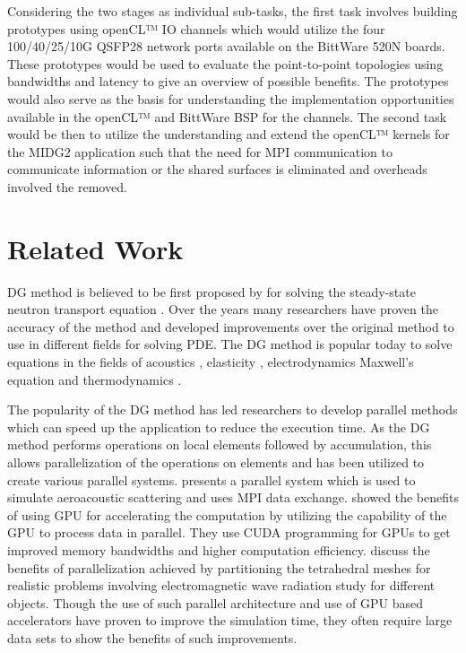 Considering the two stages as individual sub-tasks, the first task involves building
prototypes using openCL™ IO channels which would utilize the four 100/40/25/10G QSFP28
network ports available on the BittWare 520N boards. These prototypes would be used
to evaluate the point-to-point topologies using bandwidths and latency to give an
overview of possible benefits. The prototypes would also serve as the basis for
understanding the implementation opportunities available in the openCL™ and
BittWare BSP for the channels. The second task would be then to utilize the
understanding and extend the openCL™ kernels for the MIDG2 application
such that the need for MPI communication to communicate information or the shared
surfaces is eliminated and overheads involved the removed.


\section{Related Work}

\ac{DG} method is believed to be first proposed by \textcite{reed_triangular_1973} for
solving the steady-state neutron transport equation \cite{hesthaven_nodal_2008}. Over the
years many researchers have proven the accuracy of the method and developed improvements
over the original method to use in different fields for solving \ac{PDE}. The \ac{DG} method
is popular today to solve equations in the fields of acoustics \cite{wilcox_high-order_2010,
atkins_quadrature-free_1998, toulopoulos_high-order_2006}, elasticity \cite{dumbser_arbitrary_2006,
kaser_arbitrary_2006, kaser_arbitrary_2007}, electrodynamics Maxwell’s equation \cite{busch_discontinuous_2011,
cohen_discontinuous_2006, busch_discontinuous_2011, cohen_spatial_2006, cockburn_locally_2004,
konig_discontinuous_2010} and thermodynamics \cite{collis_discontinuous_2002}.

The popularity of the \ac{DG} method has led researchers to develop parallel methods
which can speed up the application to reduce the execution time. As the DG method
performs operations on local elements followed by accumulation, this allows parallelization
of the operations on elements and has been utilized to create various parallel systems.
\textcite{baggag_parallel_1999} presents a parallel system which is used to simulate aeroacoustic
scattering and uses MPI data exchange. \textcite{klockner_nodal_2009} showed the benefits
of using GPU for accelerating the computation by utilizing the capability of the GPU to
process data in parallel. They use CUDA programming for GPUs to get improved memory bandwidths
and higher computation efficiency. \textcite{bernacki_parallel_2006} discuss the benefits
of parallelization achieved by partitioning the tetrahedral meshes for realistic problems
involving electromagnetic wave radiation study for different objects. Though the use of such
parallel architecture and use of GPU based accelerators have proven
to improve the simulation time, they often require large data sets to show the benefits of
such improvements.

